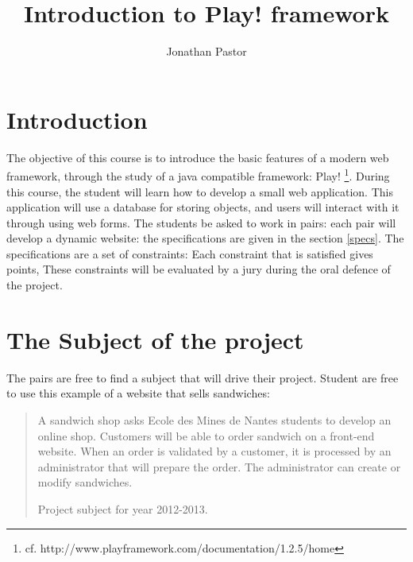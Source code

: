 \documentclass{article}         %
\title{Introduction to Play! framework}     %
\author{Jonathan Pastor}        %
\begin{document}

\maketitle                        %


\section{Introduction}

The objective of this course is to introduce the basic features of a modern web framework, through the study of a java compatible framework: Play! \footnote{cf. http://www.playframework.com/documentation/1.2.5/home}.
\newline
\newline
During this course, the student will learn how to develop a small web application. This application will use a database for storing objects, and users will interact with it through using web forms.
\newline
\newline
The students be asked to work in pairs: each pair will develop a dynamic website: the specifications are given in the section \ref{specs}. The specifications are a set of constraints: Each constraint that is satisfied gives points, These constraints will be evaluated by a jury during the oral defence of the project.



\section{The Subject of the project}

The pairs are free to find a subject that will drive their project. Student are free to use this example of a website that sells sandwiches: 

\begin{quotation}
A sandwich shop asks Ecole des Mines de Nantes students to develop an online shop. Customers will be able to order sandwich on a front-end website. When an order is validated by a customer, it is processed by an administrator that will prepare the order. The administrator can create or modify sandwiches. \par
\raggedleft Project subject for year 2012-2013.
\end{quotation}
\end{document}
